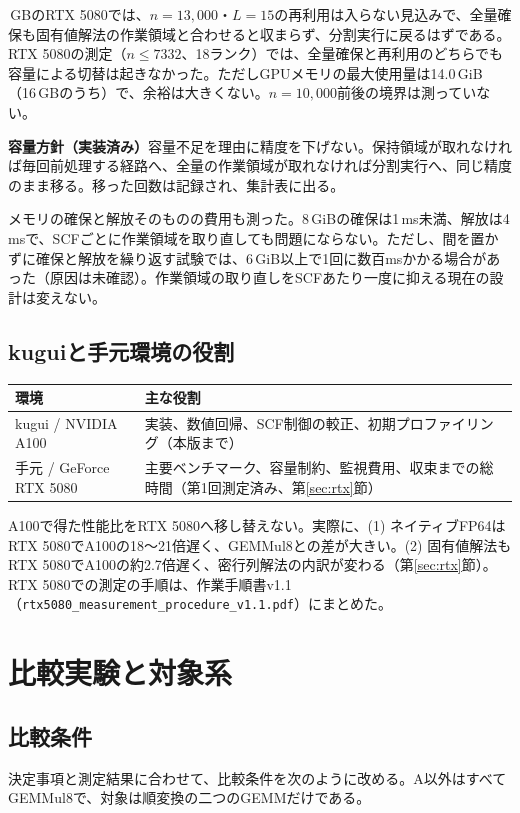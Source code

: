 \documentclass[a4paper,11pt]{ltjsarticle}
\newcommand{\code}[1]{\texttt{#1}}
\begin{document}
\,GBのRTX 5080では、$n=13{,}000$・$L=15$の再利用は入らない見込みで、全量確保も固有値解法の作業領域と合わせると収まらず、分割実行に戻るはずである。RTX 5080の測定（$n\le7332$、18ランク）では、全量確保と再利用のどちらでも容量による切替は起きなかった。ただしGPUメモリの最大使用量は14.0\,GiB（16\,GBのうち）で、余裕は大きくない。$n=10{,}000$前後の境界は測っていない。

\begin{keybox}
\textbf{容量方針（実装済み）}\quad 容量不足を理由に精度を下げない。保持領域が取れなければ毎回前処理する経路へ、全量の作業領域が取れなければ分割実行へ、同じ精度のまま移る。移った回数は記録され、集計表に出る。
\end{keybox}

メモリの確保と解放そのものの費用も測った。8\,GiBの確保は1\,ms未満、解放は4\,msで、SCFごとに作業領域を取り直しても問題にならない。ただし、間を置かずに確保と解放を繰り返す試験では、6\,GiB以上で1回に数百msかかる場合があった（原因は未確認）。作業領域の取り直しをSCFあたり一度に抑える現在の設計は変えない。

\subsection{kuguiと手元環境の役割}
\noindent\begin{tabularx}{\linewidth}{@{}p{43mm}Y@{}}
\toprule
環境 & 主な役割\\
\midrule
kugui / NVIDIA A100 & 実装、数値回帰、SCF制御の較正、初期プロファイリング（本版まで）\\
手元 / GeForce RTX 5080 & 主要ベンチマーク、容量制約、監視費用、収束までの総時間（第1回測定済み、第\ref{sec:rtx}節）\\
\bottomrule
\end{tabularx}

\medskip
A100で得た性能比をRTX 5080へ移し替えない。実際に、(1) ネイティブFP64はRTX 5080でA100の18〜21倍遅く、GEMMul8との差が大きい。(2) 固有値解法もRTX 5080でA100の約2.7倍遅く、密行列解法の内訳が変わる（第\ref{sec:rtx}節）。RTX 5080での測定の手順は、作業手順書v1.1（\code{rtx5080\_measurement\_procedure\_v1.1.pdf}）にまとめた。

\section{比較実験と対象系}
\subsection{比較条件}
決定事項と測定結果に合わせて、比較条件を次のように改める。A以外はすべてGEMMul8で、対象は順変換の二つのGEMMだけである。
\end{document}
